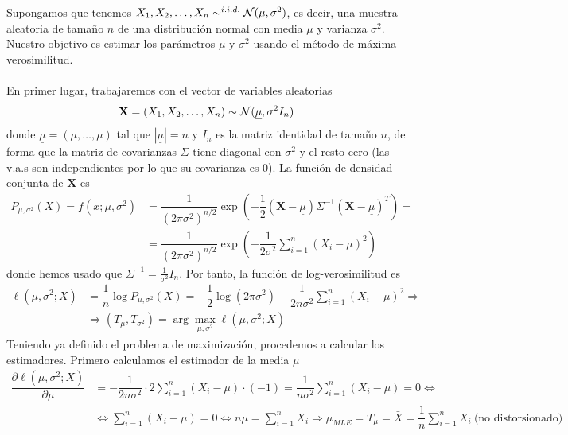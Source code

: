 \begin{ejemplo}
    Supongamos que tenemos $X_1, X_2, \ldots, X_n \sim^{i.i.d.} \mathcal{N}(\mu, \sigma^2)$, es decir, una muestra aleatoria de tamaño $n$ de una distribución normal con media $\mu$ y varianza $\sigma^2$. Nuestro objetivo es estimar los parámetros $\mu$ y $\sigma^2$ usando el método de máxima verosimilitud. \\ \\
    \noindent
    En primer lugar, trabajaremos con el vector de variables aleatorias 
    $$\mathbf{X} = (X_1, X_2, \ldots, X_n) \sim \mathcal{N}(\underline{\mu}, \sigma^2 I_n)$$
    donde $\underline{\mu}=(\mu, \ldots, \mu)$ tal que $|\underline{\mu}|=n$ y $I_n$ es la matriz identidad de tamaño $n$, de forma que la matriz de covarianzas $\Sigma$ tiene diagonal con $\sigma^2$ y el resto cero (las v.a.s son independientes por lo que su covarianza es 0). La función de densidad conjunta de $\mathbf{X}$ es
    \begin{align*}
        P_{\mu,\sigma^2}(X)=f(x;\mu,\sigma^2) &= \dfrac{1}{(2\pi\sigma^2)^{n/2}} \exp\left( -\dfrac{1}{2} (\mathbf{X} - \underline{\mu})\Sigma^{-1}(\mathbf{X} - \underline{\mu})^T \right)=\\
        &= \dfrac{1}{(2\pi\sigma^2)^{n/2}} \exp\left( -\dfrac{1}{2\sigma^2} \sum\limits_{i=1}^{n} (X_i - \mu)^2 \right)
    \end{align*}
    donde hemos usado que $\Sigma^{-1} = \frac{1}{\sigma^2} I_n$. Por tanto, la función de log-verosimilitud es
    \begin{align*}
        \ell(\mu, \sigma^2; X) &= \dfrac{1}{n} \log P_{\mu,\sigma^2}(X)= -\dfrac{1}{2} \log(2\pi\sigma^2) - \dfrac{1}{2 n \sigma^2} \sum\limits_{i=1}^{n} (X_i - \mu)^2 \Longrightarrow \\
        &\Longrightarrow(T_{\mu}, T_{\sigma^2}) = \arg \max_{\mu, \sigma^2} \ell(\mu, \sigma^2; X)
    \end{align*}
    Teniendo ya definido el problema de maximización, procedemos a calcular los estimadores. Primero calculamos el estimador de la media $\mu$
    \begin{align*}
        \dfrac{\partial \ell(\mu, \sigma^2; X)}{\partial \mu} &= -\dfrac{1}{2 n \sigma^2} \cdot 2 \sum\limits_{i=1}^{n} (X_i - \mu) \cdot (-1) = \dfrac{1}{n \sigma^2} \sum\limits_{i=1}^{n} (X_i - \mu)=0 \Longleftrightarrow \\
        &\Longleftrightarrow \sum\limits_{i=1}^{n} (X_i - \mu) = 0 \Longleftrightarrow n \mu = \sum\limits_{i=1}^{n} X_i \Longrightarrow \mu_{MLE}=T_{\mu} = \bar{X} = \dfrac{1}{n} \sum\limits_{i=1}^{n} X_i \ \text{(no distorsionado)}

\end{align*}
\end{ejemplo}
